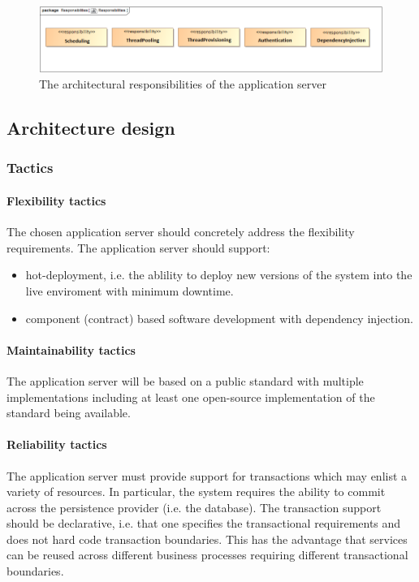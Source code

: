 \documentclass[a4paper,12pt]{report}
\begin{document}
	\begin{figure}[htb]
		\centering
		\includegraphics  [scale=0.5]{../Diagrams/applicationServerResponsibiltiesZ.png}
		\caption{The architectural responsibilities of the application server}
	\end{figure}

\FloatBarrier
\subsection {Architecture design}
\subsubsection {Tactics}
\paragraph {Flexibility tactics}
\hfill \break
The chosen application server should concretely address the flexibility requirements. The application server should support: 
	\begin {itemize}
		\item hot-deployment, i.e. the ablility to deploy new versions of the system into the live enviroment with minimum downtime.
		\item component (contract) based software development with dependency injection.
	\end {itemize}
 
\paragraph {Maintainability tactics}
\hfill \break
The application server will be based on a public standard with multiple implementations including at least one open-source implementation of the standard being available.

\paragraph {Reliability tactics}
\hfill \break
The application server must provide support for transactions which may enlist a variety of resources. In particular, the system requires the ability to commit across the persistence provider (i.e. the database). The transaction support should be declarative, i.e. that one specifies the transactional requirements and does not hard code transaction boundaries. This has the advantage that services can be reused across different business processes requiring different transactional boundaries. 
\end{document}
